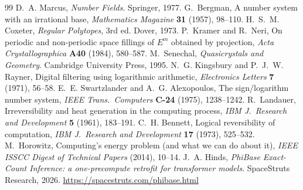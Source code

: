 \documentclass[11pt]{article}
\theoremstyle{definition}
\theoremstyle{remark}
\begin{document}
\begin{thebibliography}{99}
 D.~A. Marcus, \emph{Number Fields}. Springer, 1977.
 G.~Bergman, A number system with an irrational base,
  \emph{Mathematics Magazine} \textbf{31} (1957), 98--110.
 H.~S.~M. Coxeter, \emph{Regular Polytopes}, 3rd ed. Dover,
  1973.
 P.~Kramer and R.~Neri, On periodic and non-periodic space
  fillings of $E^m$ obtained by projection, \emph{Acta Crystallographica}
  \textbf{A40} (1984), 580--587.
 M.~Senechal, \emph{Quasicrystals and Geometry}. Cambridge
  University Press, 1995.
 N.~G. Kingsbury and P.~J.~W. Rayner, Digital filtering using
  logarithmic arithmetic, \emph{Electronics Letters} \textbf{7} (1971), 56--58.
 E.~E. Swartzlander and A.~G. Alexopoulos, The
  sign/logarithm number system, \emph{IEEE Trans.\ Computers} \textbf{C-24}
  (1975), 1238--1242.
 R.~Landauer, Irreversibility and heat generation in the
  computing process, \emph{IBM J.\ Research and Development} \textbf{5} (1961),
  183--191.
 C.~H. Bennett, Logical reversibility of computation,
  \emph{IBM J.\ Research and Development} \textbf{17} (1973), 525--532.
 M.~Horowitz, Computing's energy problem (and what we can do
  about it), \emph{IEEE ISSCC Digest of Technical Papers} (2014), 10--14.
 J.~A. Hinds, \emph{PhiBase Exact-Count Inference: a
  one-precompute retrofit for transformer models}. SpaceStruts Research, 2026.
  \url{https://spacestruts.com/phibase.html}
\end{thebibliography}
\end{document}
